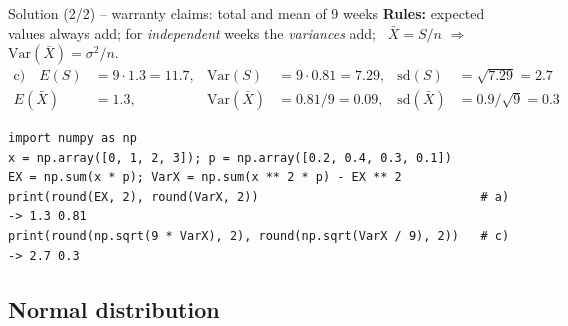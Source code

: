 \documentclass[aspectratio=169,11pt]{beamer}
\begin{document}
\begin{frame}[fragile]{Solution (2/2) -- warranty claims: total and mean of 9 weeks}
  \textbf{Rules:} expected values always add; for \emph{independent} weeks the
  \emph{variances} add; \ $\bar X=S/n$ $\Rightarrow$
  $\mathrm{Var}(\bar X)=\sigma^2/n$.
  \begin{align*}
    \text{c)}\quad E(S) &= 9\cdot1.3=\mathbf{11.7}, &
      \mathrm{Var}(S) &= 9\cdot0.81=7.29, &
      \mathrm{sd}(S) &= \sqrt{7.29}=\mathbf{2.7}\\
    E(\bar X) &= \mathbf{1.3}, &
      \mathrm{Var}(\bar X) &= 0.81/9=0.09, &
      \mathrm{sd}(\bar X) &= 0.9/\sqrt9=\mathbf{0.3}
  \end{align*}
  \par\smallskip
\begin{lstlisting}
import numpy as np
x = np.array([0, 1, 2, 3]); p = np.array([0.2, 0.4, 0.3, 0.1])
EX = np.sum(x * p); VarX = np.sum(x ** 2 * p) - EX ** 2
print(round(EX, 2), round(VarX, 2))                               # a)  -> 1.3 0.81
print(round(np.sqrt(9 * VarX), 2), round(np.sqrt(VarX / 9), 2))   # c)  -> 2.7 0.3
\end{lstlisting}
\end{frame}

\subsection{Normal distribution}
\end{document}
